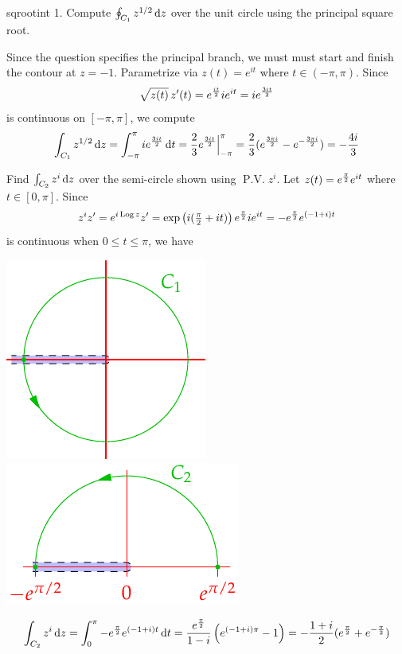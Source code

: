 \begin{examples}{}{sqrootint}
\hangindent\leftmargini
\textup{1. } Compute $\oint_{C_1}z^{1/2}\,{\mathrm{d} z}$ over the unit circle using the principal square root.
\begin{enumerate}\setcounter{enumi}{1}
\begin{minipage}[t]{0.65\linewidth}\vspace{-7pt}
	\item[]Since the question specifies the principal branch, we must must start and finish the contour at $z=-1$. Parametrize via $z(t)=e^{it}$ where $t\in(-\pi,\pi)$. Since
	\[\sqrt{z(t)}\,z'(t)=e^{\frac{it}{2}}ie^{it}=ie^{\frac{3it}{2}}\]
	is continuous on $[-\pi,\pi]$, we compute
\[\int_{C_1}z^{1/2}\,{\mathrm{d} z}=\int_{-\pi}^\pi ie^{\frac{3it}{2}}\,{\mathrm{d} t} =\frac 23e^{\frac{3it}{2}}\Big|_{-\pi}^{\pi} =\frac 23(e^{\frac{3\pi i}{2}}-e^{-\frac{3\pi i}{2}})=-\frac{4i}3\]

\item Find $\int_{C_2}z^i\,{\mathrm{d} z}$ over the semi-circle shown using $\operatorname{P.V.}z^i$.\smallbreak
Let $z(t)=e^{\frac{\pi}{2}} e^{it}$ where $t\in[0,\pi]$. Since
\[z^iz'=e^{i\operatorname{Log} z}z'=\exp\left(i(\tfrac\pi 2+it)\right)e^{\frac{\pi}{2}}ie^{it}=-e^{\frac{\pi}{2}}e^{(-1+i)t}\]
is continuous when $0\le t\le \pi$, we have
\end{minipage}\begin{minipage}[t]{0.35\linewidth}\vspace{-10pt}
	\flushright\includegraphics{contour-branch2}\bigbreak\medbreak
	\includegraphics{contour-branch3}
	\end{minipage}
	\[\int_{C_2}z^i\,{\mathrm{d} z}=\int_0^\pi -e^{\frac{\pi}{2}}e^{(-1+i)t}\,{\mathrm{d} t} =\frac{e^{\frac{\pi}{2}}}{1-i}\left(e^{(-1+i)\pi}-1\right) =-\frac{1+i}{2}(e^{\frac{\pi}{2}}+e^{-\frac{\pi}{2}})\]
\end{enumerate}
\end{examples}





